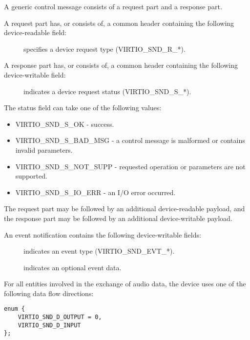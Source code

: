 A generic control message consists of a request part and a response part.

A request part has, or consists of, a common header containing the following
device-readable field:

\begin{description}
\item[] specifies a device request type (VIRTIO_SND_R_*).
\end{description}

A response part has, or consists of, a common header containing the following
device-writable field:

\begin{description}
\item[] indicates a device request status (VIRTIO_SND_S_*).
\end{description}

The status field can take one of the following values:

\begin{itemize}
\item VIRTIO_SND_S_OK - success.
\item VIRTIO_SND_S_BAD_MSG - a control message is malformed or contains invalid
parameters.
\item VIRTIO_SND_S_NOT_SUPP - requested operation or parameters are not supported.
\item VIRTIO_SND_S_IO_ERR - an I/O error occurred.
\end{itemize}

The request part may be followed by an additional device-readable payload,
and the response part may be followed by an additional device-writable payload.

An event notification contains the following device-writable fields:

\begin{description}
\item[] indicates an event type (VIRTIO_SND_EVT_*).
\item[] indicates an optional event data.
\end{description}

For all entities involved in the exchange of audio data, the device uses one of
the following data flow directions:

\begin{lstlisting}
enum {
    VIRTIO_SND_D_OUTPUT = 0,
    VIRTIO_SND_D_INPUT
};
\end{lstlisting}

